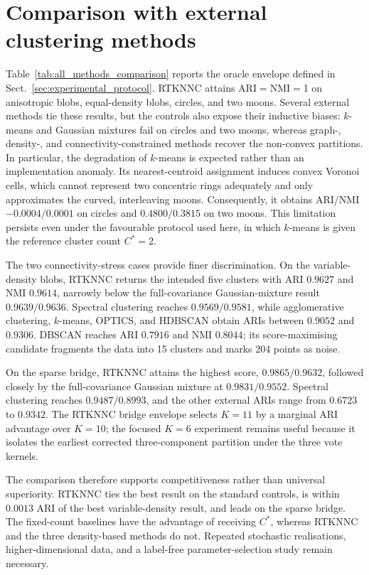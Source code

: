 \documentclass[pdflatex,sn-mathphys-num]{sn-jnl}
\begin{document}
\section{Comparison with external clustering methods}
\label{sec:baseline_comparison}

Table~\ref{tab:all_methods_comparison} reports the oracle envelope defined in
Sect.~\ref{sec:experimental_protocol}.  RTKNNC attains
ARI${}={}$NMI${}={}$1 on anisotropic blobs, equal-density blobs, circles, and
two moons.  Several external methods tie these results, but the controls also
expose their inductive biases: $k$-means and Gaussian mixtures fail on circles
and two moons, whereas graph-, density-, and connectivity-constrained methods
recover the non-convex partitions.  In particular, the degradation of
$k$-means is expected rather than an implementation anomaly.  Its
nearest-centroid assignment induces convex Voronoi cells, which cannot
represent two concentric rings adequately and only approximates the curved,
interleaving moons.  Consequently, it obtains ARI/NMI
$-0.0004/0.0001$ on circles and $0.4800/0.3815$ on two moons.  This limitation
persists even under the favourable protocol used here, in which $k$-means is
given the reference cluster count $C^*=2$.

The two connectivity-stress cases provide finer discrimination.  On the
variable-density blobs, RTKNNC returns the intended five clusters with ARI
$0.9627$ and NMI $0.9614$, narrowly below the full-covariance Gaussian-mixture
result $0.9639/0.9636$.  Spectral clustering reaches $0.9569/0.9581$, while
agglomerative clustering, $k$-means, OPTICS, and HDBSCAN obtain ARIs between
$0.9052$ and $0.9306$.  DBSCAN reaches ARI $0.7916$ and NMI $0.8044$; its
score-maximising candidate fragments the data into 15 clusters and marks 204
points as noise.

On the sparse bridge, RTKNNC attains the highest score,
$0.9865/0.9632$, followed closely by the full-covariance Gaussian mixture at
$0.9831/0.9552$.  Spectral clustering reaches $0.9487/0.8993$, and the other
external ARIs range from $0.6723$ to $0.9342$.  The RTKNNC bridge envelope
selects $K=11$ by a marginal ARI advantage over $K=10$; the focused $K=6$
experiment remains useful because it isolates the earliest corrected
three-component partition under the three vote kernels.



The comparison therefore supports competitiveness rather than universal
superiority.  RTKNNC ties the best result on the standard controls, is within
$0.0013$ ARI of the best variable-density result, and leads on the sparse
bridge.  The fixed-count baselines have the advantage of receiving $C^*$,
whereas RTKNNC and the three density-based methods do not.  Repeated
stochastic realisations, higher-dimensional data, and a label-free
parameter-selection study remain necessary.
\end{document}
